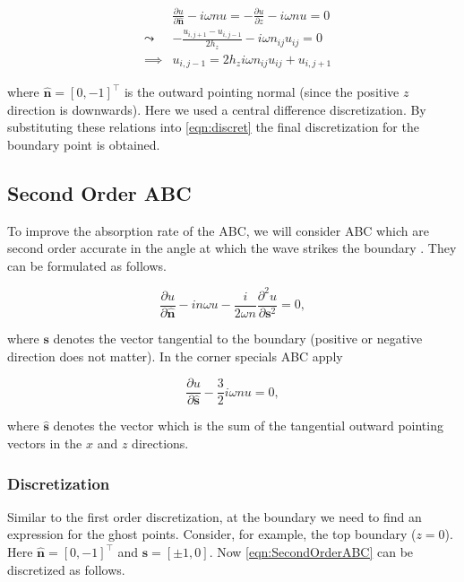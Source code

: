 \documentclass[10pt,a4paper]{article}
\newcommand{\n}{\mathbf{n}}
\newcommand{\s}{\mathbf{s}}
\begin{document}
\begin{eqnarray}
&& \frac{\partial u}{\partial \hat{\n}} - i\omega nu = -\frac{\partial u}{\partial z} - i\omega nu =0\\
&\leadsto& -\frac{u_{i,j+1}-u_{i,j-1}}{2h_z}-i\omega n_{ij} u_{ij}=0\\
&\implies& u_{i,j-1} = 2h_zi\omega n_{ij}u_{ij}+u_{i,j+1}
\end{eqnarray}

where $\hat{\n}=[0,-1]^\top$ is the outward pointing normal (since the positive $z$ direction is downwards). Here we used a central difference discretization. By substituting these relations into \cref{eqn:discret} the final discretization for the boundary point is obtained. 

\subsection{Second Order ABC}
To improve the absorption rate of the ABC, we will consider ABC which are second order accurate in the angle at which the wave strikes the boundary \cite{AbsorpationRates}. They can be formulated as follows.

\begin{equation} \label{eqn:SecondOrderABC}
\frac{\partial u}{\partial \hat{\n}} - in\omega u - \frac{i}{2\omega n}\frac{\partial^2 u}{\partial \s^2}=0,
\end{equation}

where $\s$ denotes the vector tangential to the boundary (positive or negative direction does not matter). In the corner specials ABC apply \cite{SecondOrderCorner}

\begin{equation}
\frac{\partial u}{\partial \hat{\s}}-\frac{3}{2}i\omega nu=0,
\end{equation}

where $\hat{\s}$ denotes the vector which is the sum of the tangential outward pointing vectors in the $x$ and $z$ directions.

\subsubsection{Discretization}
Similar to the first order discretization, at the boundary we need to find an expression for the ghost points. Consider, for example, the top boundary ($z=0$). Here $\hat{\n}=[0,-1]^\top$ and $\s=[\pm 1,0]$. Now \cref{eqn:SecondOrderABC} can be discretized as follows.
\end{document}
